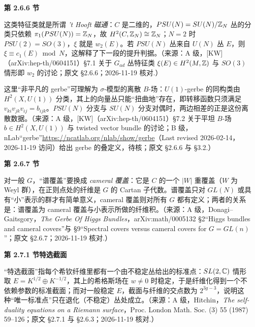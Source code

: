 \medskip\noindent\textbf{第 2.6.6 节\quad }\par\nopagebreak
\begin{description}[leftmargin=5.8em,labelwidth=5em,labelsep=0.6em,itemsep=0.15ex,topsep=0.2ex]
\item[2.6.6-1] 这类特征类就是所谓 \emph{'t Hooft 磁通}：$C$ 是二维的，$PSU(N)=SU(N)/\Bbb Z_N$ 丛的分类只依赖 $\pi_1(PSU(N))=\Bbb Z_N$，故 $H^2(C,\Bbb Z_N)\cong\Bbb Z_N$；$N=2$ 时 $PSU(2)=SO(3)$，$\xi$ 就是 $w_2(E)$。若 $PSU(N)$ 丛来自 $U(N)$ 丛 $E$，则 $\xi\equiv c_1(E)\bmod N$，这解释了下一段的提升判据。（来源：A 级，[KW]（arXiv:hep-th/0604151）§7.1 关于 $G_{ad}$ 丛特征类 $\xi(E)\in H^2(M,\Bbb Z)$ 与 $SO(3)$ 情形即 $w_2$ 的讨论；原文 §2.6.6；2026-11-19 核对.）
\item[2.6.6-2] 这里“非平凡的 gerbe”可理解为 $\sigma$-模型的离散 $B$-场：$U(1)$-gerbe 的同构类由 $H^2(X,U(1))$ 分类，其上的向量丛只能“扭曲地”存在，即转移函数只须满足 $v_{ki}v_{jk}v_{ij}=b_{ijk}$。$PSU(N)$ 分支与 $SU(N)$ 分支对偶时，两边相差的正是这份离散数据。（来源：A 级，[KW]（arXiv:hep-th/0604151）§7.2 关于平坦 $B$-场 $b\in H^2(X,U(1))$ 与 twisted vector bundle 的讨论；B 级，nLab“gerbe”\url{https://ncatlab.org/nlab/show/gerbe}（Last revised 2026-02-14，2026-11-19 访问）给出 gerbe 的叠定义，待核；原文 §2.6.6 与 §3.2.）
\end{description}
\medskip\noindent\textbf{第 2.6.7 节\quad }\par\nopagebreak
\begin{description}[leftmargin=5.8em,labelwidth=5em,labelsep=0.6em,itemsep=0.15ex,topsep=0.2ex]
\item[2.6.7-1] 对一般 $G$，“谱覆盖”要换成 \emph{cameral 覆盖}：它是 $C$ 的一个 $|W|$ 重覆盖（$W$ 为 Weyl 群），在正则点处的纤维是 $G$ 的 Cartan 子代数。谱覆盖只对 $GL(N)$ 或具有“小”表示的群才有简单意义，cameral 覆盖则对所有 $G$ 都有定义；两者的关系是：谱覆盖为 cameral 覆盖与小表示所做的纤维积。（来源：A 级，Donagi–Gaitsgory，\emph{The Gerbe Of Higgs Bundles}，arXiv:math/0005132 §2“Higgs bundles and cameral covers”与 §9“Spectral covers versus cameral covers for $G=GL(n)$”；原文 §2.6.7；2026-11-19 核对.）
\end{description}
\medskip\noindent\textbf{第 2.7.1 节\quad 特选截面}\par\nopagebreak
\begin{description}[leftmargin=5.8em,labelwidth=5em,labelsep=0.6em,itemsep=0.15ex,topsep=0.2ex]
\item[2.7.1-1] “特选截面”指每个希钦纤维里都有一个由不稳定丛给出的标准点：$SL(2,\Bbb C)$ 情形取 $E=K^{1/2}\oplus K^{-1/2}$，其上的希格斯场在 $w\neq0$ 时稳定，于是纤维化得到一个不依赖参数的标准截面；而对一般稳定 $E$，截面与纤维的交点数为 $2^{3g-3}$，说明这种“唯一标准点”只在退化（不稳定）丛处成立。（来源：A 级，Hitchin，\emph{The self-duality equations on a Riemann surface}，Proc. London Math. Soc. (3) 55 (1987) 59–126；原文 §2.7.1 与 §2.6.3；2026-11-19 核对.）
\end{description}
